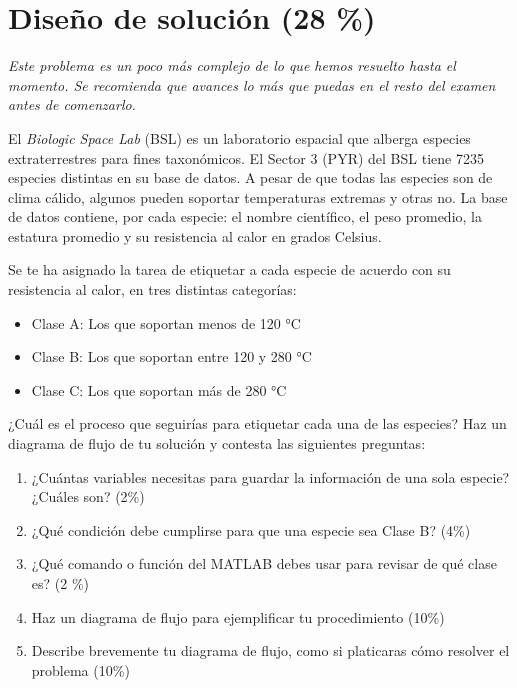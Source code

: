 \documentclass[11pt]{article}
\begin{document}
\section{Diseño de solución (28 \%)}

{\footnotesize \it
Este problema es un poco más complejo de lo que hemos resuelto hasta el momento.
Se recomienda que avances lo más que puedas en el resto del examen antes de comenzarlo.
}

\bigskip

El \textit{Biologic Space Lab} (BSL) es un laboratorio espacial que alberga especies extraterrestres para fines taxonómicos.
El Sector 3 (PYR) del BSL tiene 7235 especies distintas en su base de datos. A pesar de que todas las especies son de clima cálido, algunos pueden soportar temperaturas extremas y otras no.
La base de datos contiene, por cada especie: el nombre científico, el peso promedio, la estatura promedio y su resistencia al calor en grados Celsius.

Se te ha asignado la tarea de etiquetar a cada especie de acuerdo con su resistencia al calor, en tres distintas categorías:

\begin{itemize}
    \item Clase A: Los que soportan menos de 120 °C
    \item Clase B: Los que soportan entre 120 y 280 °C
    \item Clase C: Los que soportan más de 280 °C
\end{itemize}

¿Cuál es el proceso que seguirías para etiquetar cada una de las especies?
Haz un diagrama de flujo de tu solución y contesta las siguientes preguntas:

\begin{enumerate}[label=\alph*)]
    \item ¿Cuántas variables necesitas para guardar la información de una sola especie? ¿Cuáles son? (2\%)
    \item ¿Qué condición debe cumplirse para que una especie sea Clase B? (4\%)
    \item ¿Qué comando o función del MATLAB debes usar para revisar de qué clase es? (2 \%)
    \item Haz un diagrama de flujo para ejemplificar tu procedimiento  (10\%)
    \item Describe brevemente tu diagrama de flujo, como si platicaras cómo resolver el problema (10\%)
\end{enumerate}
\end{document}
